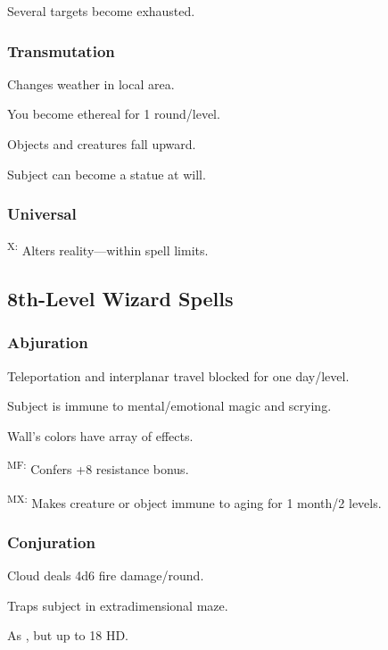 	 Several targets become exhausted.

\subsubsection{Transmutation}
	 Changes weather in local area.

	 You become ethereal for 1 round/level.

	 Objects and creatures fall upward.

	 Subject can become a statue at will.

\subsubsection{Universal}
	\textsuperscript{X:} Alters reality---within spell limits.



\subsection{8th-Level Wizard Spells}

\subsubsection{Abjuration}
	 Teleportation and interplanar travel blocked for one day/level.

	 Subject is immune to mental/emotional magic and scrying.

	 Wall's colors have array of effects.

	\textsuperscript{MF:} Confers +8 resistance bonus.

	\textsuperscript{MX:} Makes creature or object immune to aging for 1 month/2 levels. %

\subsubsection{Conjuration}
	 Cloud deals 4d6 fire damage/round.

	 Traps subject in extradimensional maze.

	 As , but up to 18 HD.

